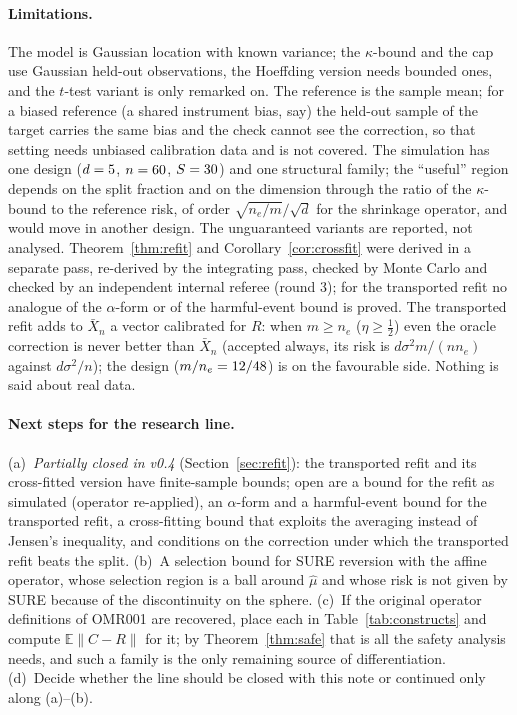 \documentclass[10pt,a4paper]{article}
\theoremstyle{plain}
\theoremstyle{definition}
\theoremstyle{remark}
\newcommand{\E}{\mathbb{E}}
\newcommand{\norm}[1]{\lVert #1\rVert}
\begin{document}
\paragraph{Limitations.}
The model is Gaussian location with known variance; the $\kappa$-bound and the cap use Gaussian held-out observations, the Hoeffding version needs bounded ones, and the $t$-test variant is only remarked on. The reference is the sample mean; for a biased reference (a shared instrument bias, say) the held-out sample of the target carries the same bias and the check cannot see the correction, so that setting needs unbiased calibration data and is not covered. The simulation has one design ($d=5$, $n=60$, $S=30$) and one structural family; the ``useful'' region depends on the split fraction and on the dimension through the ratio of the $\kappa$-bound to the reference risk, of order $\sqrt{n_e/m}/\sqrt d$ for the shrinkage operator, and would move in another design. The unguaranteed variants are reported, not analysed. Theorem~\ref{thm:refit} and Corollary~\ref{cor:crossfit} were derived in a separate pass, re-derived by the integrating pass, checked by Monte Carlo and checked by an independent internal referee (round 3); for the transported refit no analogue of the $\alpha$-form or of the harmful-event bound is proved. The transported refit adds to $\bar X_n$ a vector calibrated for $R$: when $m\ge n_e$ ($\eta\ge\tfrac12$) even the oracle correction is never better than $\bar X_n$ (accepted always, its risk is $d\sigma^2m/(nn_e)$ against $d\sigma^2/n$); the design ($m/n_e=12/48$) is on the favourable side. Nothing is said about real data.

\paragraph{Next steps for the research line.}
(a)~\emph{Partially closed in v0.4} (Section~\ref{sec:refit}): the transported refit and its cross-fitted version have finite-sample bounds; open are a bound for the refit as simulated (operator re-applied), an $\alpha$-form and a harmful-event bound for the transported refit, a cross-fitting bound that exploits the averaging instead of Jensen's inequality, and conditions on the correction under which the transported refit beats the split. (b)~A selection bound for SURE reversion with the affine operator, whose selection region is a ball around $\hat\mu$ and whose risk is not given by SURE because of the discontinuity on the sphere. (c)~If the original operator definitions of OMR001 are recovered, place each in Table~\ref{tab:constructs} and compute $\E\norm{C-R}$ for it; by Theorem~\ref{thm:safe} that is all the safety analysis needs, and such a family is the only remaining source of differentiation. (d)~Decide whether the line should be closed with this note or continued only along (a)--(b).
\end{document}
